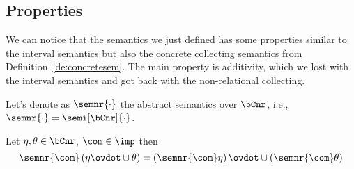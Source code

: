 \subsection{Properties}\label{sub:nonrelprop}

We can notice that the semantics we just defined has some properties
similar to the interval semantics but also the concrete collecting
semantics from Definition~\ref{de:concretesem}. The main property is
additivity, which we lost with the interval semantics and got back
with the non-relational collecting.

\medskip

\noindent
Let's denote as \(\semnr{\cdot}\) the abstract semantics over
\(\bCnr\), i.e., \(\semnr{\cdot} = \semi[\bCnr]{\cdot}\).

\begin{lemma}[Additivity]
  Let \(\eta, \theta \in \bCnr\), \(\com\in\imp\) then
  \begin{equation*}
    \semnr{\com}\left(\eta \ovdot\cup \theta\right) = \left(\semnr{\com}\eta\right) \ovdot\cup \left(\semnr{\com}\theta\right)
  \end{equation*}
\end{lemma}

